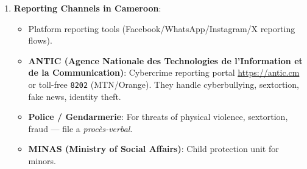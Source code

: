 \documentclass[11pt]{article}
\begin{document}
\begin{methode}
\begin{enumerate}
          \begin{enumerate}
              \item \textbf{S}creenshot evidence (timestamp, URL, profile).
              \item \textbf{T}ell a trusted adult / school authority / HR (if workplace).
              \item \textbf{O}pt out: Block, restrict, report on platform.
              \item \textbf{P}reserve mental health: Talk to counsellor; don't engage with trolls.
          \end{enumerate}
    \item \textbf{Reporting Channels in Cameroon}:
          \begin{itemize}
              \item Platform reporting tools (Facebook/WhatsApp/Instagram/X reporting flows).
              \item \textbf{ANTIC (Agence Nationale des Technologies de l'Information et de la Communication)}: Cybercrime reporting portal \url{https://antic.cm} or toll-free \texttt{8202} (MTN/Orange). They handle cyberbullying, sextortion, fake news, identity theft.
              \item \textbf{Police / Gendarmerie}: For threats of physical violence, sextortion, fraud — file a \textit{procès-verbal}.
              \item \textbf{MINAS (Ministry of Social Affairs)}: Child protection unit for minors.
          \end{itemize}
\end{enumerate}
\end{methode}
\end{document}
